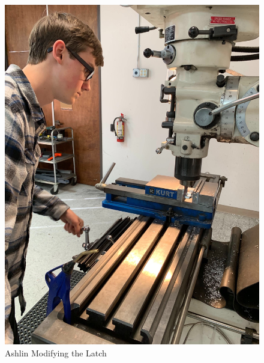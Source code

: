 \documentclass{article}
\begin{document}
\begin{figure}
    \centering
    \includegraphics[width= 0.5 \textwidth]{32_04-08/images/ashlinmachining.jpg}
    \caption{Ashlin Modifying the Latch}
    \label{fig:latch}
\end{figure}
\end{document}
